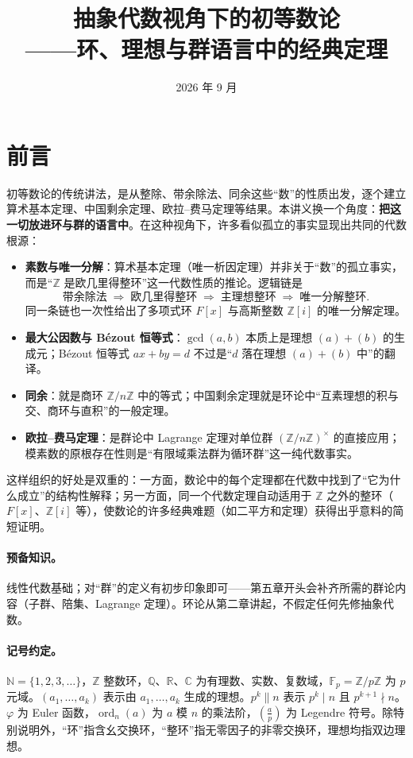 \documentclass[a4paper,11pt]{ctexart}
\title{\textbf{抽象代数视角下的初等数论}\\[0.4em]
\large ——环、理想与群语言中的经典定理}
\author{}
\date{2026 年 9 月}
\numberwithin{equation}{section}
\theoremstyle{plain}
\theoremstyle{definition}
\theoremstyle{remark}
\newcommand{\Z}{\mathbb{Z}}
\newcommand{\Q}{\mathbb{Q}}
\newcommand{\R}{\mathbb{R}}
\newcommand{\Cc}{\mathbb{C}}
\newcommand{\F}{\mathbb{F}}
\newcommand{\N}{\mathbb{N}}
\DeclareMathOperator{\ord}{ord}
\newcommand{\leg}[2]{\left(\frac{#1}{#2}\right)}
\newcommand{\Ga}{\mathbb{Z}[i]}
\begin{document}
\maketitle
\tableofcontents
\newpage

\section*{前言}

初等数论的传统讲法，是从整除、带余除法、同余这些“数”的性质出发，逐个建立算术基本定理、中国剩余定理、欧拉--费马定理等结果。本讲义换一个角度：\textbf{把这一切放进环与群的语言中}。在这种视角下，许多看似孤立的事实显现出共同的代数根源：

\begin{itemize}[itemsep=0.2em]
  \item \textbf{素数与唯一分解}：算术基本定理（唯一析因定理）并非关于“数”的孤立事实，而是“$\Z$ 是欧几里得整环”这一代数性质的推论。逻辑链是
  \[
    \text{带余除法} \;\Longrightarrow\; \text{欧几里得整环} \;\Longrightarrow\; \text{主理想整环} \;\Longrightarrow\; \text{唯一分解整环}.
  \]
  同一条链也一次性给出了多项式环 $F[x]$ 与高斯整数 $\Ga$ 的唯一分解定理。
  \item \textbf{最大公因数与 Bézout 恒等式}：$\gcd(a,b)$ 本质上是理想 $(a)+(b)$ 的生成元；Bézout 恒等式 $ax+by=d$ 不过是“$d$ 落在理想 $(a)+(b)$ 中”的翻译。
  \item \textbf{同余}：就是商环 $\Z/n\Z$ 中的等式；中国剩余定理就是环论中“互素理想的积与交、商环与直积”的一般定理。
  \item \textbf{欧拉--费马定理}：是群论中 Lagrange 定理对单位群 $(\Z/n\Z)^{\times}$ 的直接应用；模素数的原根存在性则是“有限域乘法群为循环群”这一纯代数事实。
\end{itemize}

这样组织的好处是双重的：一方面，数论中的每个定理都在代数中找到了“它为什么成立”的结构性解释；另一方面，同一个代数定理自动适用于 $\Z$ 之外的整环（$F[x]$、$\Ga$ 等），使数论的许多经典难题（如二平方和定理）获得出乎意料的简短证明。

\paragraph{预备知识。}线性代数基础；对“群”的定义有初步印象即可——第五章开头会补齐所需的群论内容（子群、陪集、Lagrange 定理）。环论从第二章讲起，不假定任何先修抽象代数。

\paragraph{记号约定。}$\N=\{1,2,3,\dots\}$，$\Z$ 整数环，$\Q$、$\R$、$\Cc$ 为有理数、实数、复数域，$\F_p=\Z/p\Z$ 为 $p$ 元域。$(a_1,\dots,a_k)$ 表示由 $a_1,\dots,a_k$ 生成的理想。$p^k \parallel n$ 表示 $p^k \mid n$ 且 $p^{k+1}\nmid n$。$\varphi$ 为 Euler 函数，$\ord_n(a)$ 为 $a$ 模 $n$ 的乘法阶，$\leg{a}{p}$ 为 Legendre 符号。除特别说明外，“环”指含幺交换环，“整环”指无零因子的非零交换环，理想均指双边理想。
\end{document}
